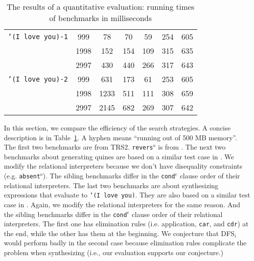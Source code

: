 \documentclass[format=acmlarge, review=false, authordraft=false]{acmart}
\newcommand{\conde}{\texttt{cond$^e$}}
\newcommand{\reverso}{\texttt{revers$^o$}}
\newcommand{\DFSi }[0]{DFS$_{i}$}
\begin{document}
\begin{table}
\begin{tabular}{|c|c|c|c|c|c|c|}
\texttt{'(I love you)-1}&  999 &  78 &  70 &  59 & 254 & 605 \\
						& 1998 & 152 & 154 & 109 & 315 & 635 \\
						& 2997 & 430 & 440 & 266 & 317 & 643 \\
		\hline
\texttt{'(I love you)-2}&  999 & 631 & 173 &  61 & 253 & 605 \\
						& 1998 &1233 & 511 & 111 & 308 & 659 \\
						& 2997 &2145 & 682 & 269 & 307 & 642 \\ 
		\hline 
	\end{tabular}
	\caption{The results of a quantitative evaluation: running times of 
	benchmarks in milliseconds}
	\label{compare-efficiency}
\end{table}

In this section, we compare the efficiency of the search strategies. A concise 
description is in Table~\ref{compare-efficiency}. A hyphen means ``running out
of 500 MB memory''. The first two benchmarks are from 
TRS2. \reverso{} is from 
\citet{rozplokhas2018improving}. 
The next two benchmarks about generating quines are based on a similar test 
case in 
\citet{byrd2017unified}. We modify the relational interpreters because we don't 
have disequality constraints (e.g. \texttt{absent$^o$}). The sibling 
benchmarks differ in the \conde{} clause order of their relational 
interpreters.
The last two benchmarks are about synthesizing expressions that 
evaluate to \texttt{'(I love you)}. 
They are also based on a similar test case in \mbox{\citet{byrd2017unified}}. 
Again, 
we modify the relational interpreters for the same reason. And the sibling 
benchmarks differ in the \conde{} clause order of their relational 
interpreters. The first one has elimination rules (i.e. application, 
\texttt{car}, and \texttt{cdr}) at the end, while the other has them at the 
beginning. We conjecture that \DFSi{} would perform badly in the second case 
because elimination rules complicate the problem when synthesizing (i.e., our 
evaluation supports our conjecture.)
\end{document}
